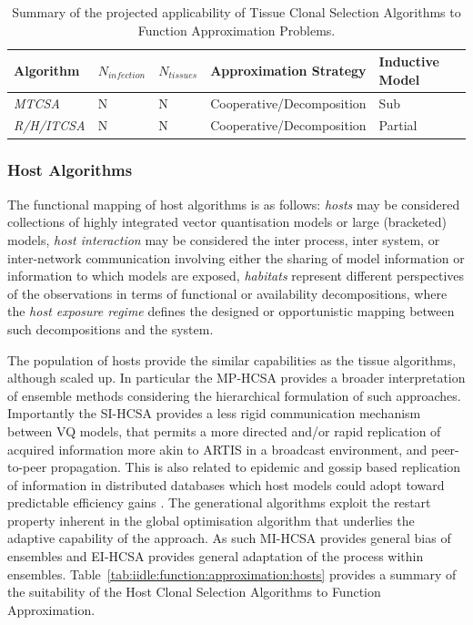 \begin{table}[htp]
	\centering\small
		\begin{tabular}{lllll}
		\toprule
		\textbf{Algorithm} & \textbf{$N_{infection}$} & \textbf{$N_{tissues}$} & \textbf{Approximation Strategy} & \textbf{Inductive Model} \\ 
		\toprule
		\emph{MTCSA} 		 & N & N & Cooperative/Decomposition & Sub \\				
		\emph{R/H/ITCSA} & N & N & Cooperative/Decomposition & Partial \\ 			
		\bottomrule
		\end{tabular}
	\caption{Summary of the projected applicability of Tissue Clonal Selection Algorithms to Function Approximation Problems.}
	\label{tab:iidle:function:approximation:tissues}
\end{table}

%
%
\subsubsection{Host Algorithms}
\label{subsec:iidle:function:approximation:applicability:hosts}
The functional mapping of host algorithms is as follows: \emph{hosts} may be considered collections of highly integrated vector quantisation models or large (bracketed) models, \emph{host interaction} may be considered the inter process, inter system, or inter-network communication involving either the sharing of model information or information to which models are exposed, \emph{habitats} represent different perspectives of the observations in terms of functional or availability decompositions, where the \emph{host exposure regime} defines the designed or opportunistic mapping between such decompositions and the system.

The population of hosts provide the similar capabilities as the tissue algorithms, although scaled up. In particular the MP-HCSA provides a broader interpretation of ensemble methods considering the hierarchical formulation of such approaches. Importantly the SI-HCSA provides a less rigid communication mechanism between VQ models, that permits a more directed and/or rapid replication of acquired information more akin to ARTIS in a broadcast environment, and peer-to-peer propagation. This is also related to epidemic and gossip based replication of information in distributed databases which host models could adopt toward predictable efficiency gains \cite{Demers1987, Voulgaris2005}.
The generational algorithms exploit the restart property inherent in the global optimisation algorithm that underlies the adaptive capability of the approach. As such MI-HCSA provides general bias of ensembles and EI-HCSA provides general adaptation of the process within ensembles. 
Table~\ref{tab:iidle:function:approximation:hosts} provides a summary of the suitability of the Host Clonal Selection Algorithms to Function Approximation.

